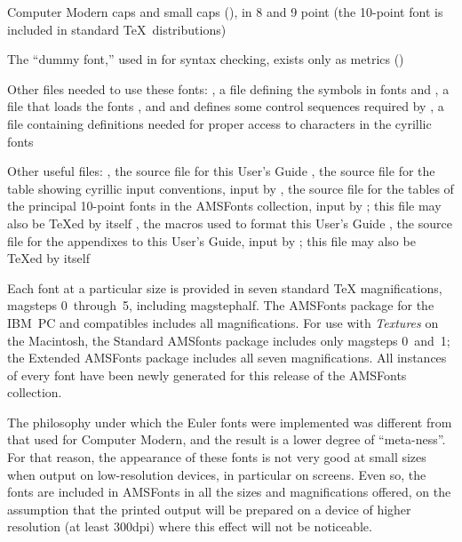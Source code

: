 \item{\bull} Computer Modern caps and small caps (),
  in 8 and 9 point
 (the 10-point font is included in standard \TeX\ distributions)

\item{\bull} The ``dummy font,'' used in \AmSTeX{} for syntax checking,
  exists only as metrics ()

\item{\bull} Other files needed to use these fonts:
\itemitem{--} , a file defining the symbols in fonts
   and 
\itemitem{--} , a file that loads the fonts
  ,  and  and defines some
  control sequences required by 
\itemitem{--} , a file containing definitions needed for
  proper access to characters in the cyrillic fonts

\item{\bull} Other useful files:
\itemitem{--} , the source file for this User's Guide
\itemitem{--} , the source file for the table showing
  cyrillic input conventions, input by 
\itemitem{--} , the source file for the tables of
  the principal 10-point fonts in the AMSFonts collection, input by
  ; this file may also be \TeX{}ed by itself
\itemitem{--} , the macros used to format this
  User's Guide
\itemitem{--} , the source file for the appendixes
   to this User's Guide, input by
  ; this file may also be \TeX{}ed by itself
\endgraf
\endgroup       %

\noindent
Each font at a particular size is provided in seven standard \TeX{}
magnifications, magsteps 0~through~5, including magstephalf.  The AMSFonts
package for the IBM~PC and compatibles includes all magnifications.  For
use with {\it Textures\/} on the Macintosh, the Standard AMSfonts package
includes only magsteps 0~and~1; the Extended AMSFonts package includes all
seven magnifications.  All instances of every font have been newly
generated for this release of the AMSFonts collection.

The philosophy under which the Euler fonts were implemented was different
from that used for Computer Modern, and the result is a lower degree of
``meta-ness''.  For that reason, the appearance of these fonts is not
very good at small sizes when output on low-resolution devices, in
particular on screens.  Even so, the fonts are included in AMSFonts in all
the sizes and magnifications offered, on the assumption that the printed
output will be prepared on a device of higher resolution (at least 300dpi)
where this effect will not be noticeable.

